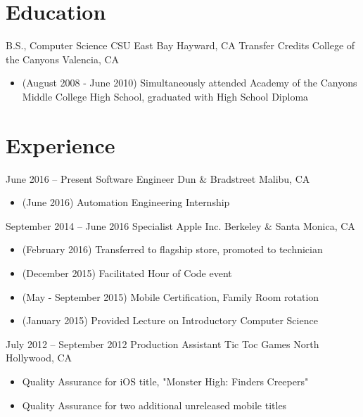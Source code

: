 \documentclass[11pt,a4paper,sans]{moderncv}        %
\begin{document}
\makecvtitle

\section{Education}
  {B.S., Computer Science}
        {CSU East Bay}              {Hayward, CA}               {}{}  %
  {Transfer Credits}
        {College of the Canyons}    {Valencia, CA}              {}
{
  \begin{itemize}
  \item (August 2008 - June 2010) Simultaneously attended Academy of the Canyons Middle College High School, graduated with High School Diploma
  \end{itemize}
}

\section{Experience}		%
\cventry
{June 2016 -- Present}          {Software Engineer}
{Dun \& Bradstreet}             {Malibu, CA}
{}
{
    \begin{itemize}
    \item (June 2016) Automation Engineering Internship
    \end{itemize}
}

\cventry
{September 2014 -- June 2016}	{Specialist}
{Apple Inc.}	                {Berkeley \& Santa Monica, CA}
{}
{
  \begin{itemize}
  \item (February 2016) Transferred to flagship store, promoted to technician
  \item (December 2015) Facilitated Hour of Code event
  \item (May - September 2015) Mobile Certification, Family Room rotation
  \item (January 2015) Provided Lecture on Introductory Computer Science
  \end{itemize}
}	%

\cventry
{July 2012 -- September 2012}	{Production Assistant}
{Tic Toc Games}	{North Hollywood, CA}
{}
{
  \begin{itemize}
  \item Quality Assurance for iOS title, "Monster High: Finders Creepers"
  \item Quality Assurance for two additional unreleased mobile titles
  \end{itemize}
}	%
\end{document}
